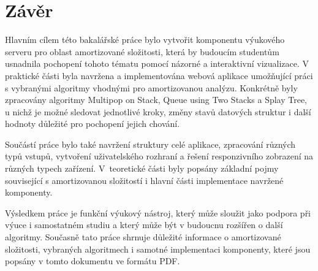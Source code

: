 \chapter{Závěr}
Hlavním cílem této bakalářské práce bylo vytvořit komponentu výukového serveru pro oblast amortizované složitosti, která by budoucím studentům usnadnila pochopení tohoto tématu pomocí názorné a interaktivní vizualizace. V praktické části byla navržena a implementována webová aplikace umožňující práci s vybranými algoritmy vhodnými pro amortizovanou analýzu. Konkrétně byly zpracovány algoritmy Multipop on Stack, Queue using Two Stacks a Splay Tree, u nichž je možné sledovat jednotlivé kroky, změny stavů datových struktur i další hodnoty důležité pro pochopení jejich chování.

Součástí práce bylo také navržení struktury celé aplikace, zpracování různých typů vstupů, vytvoření uživatelského rozhraní a řešení responzivního zobrazení na různých typech zařízení. V~teoretické části byly popsány základní pojmy související s amortizovanou složitostí i hlavní části implementace navržené komponenty.

Výsledkem práce je funkční výukový nástroj, který může sloužit jako podpora při výuce i samostatném studiu a který může být v budoucnu rozšířen o další algoritmy. Současně tato práce shrnuje důležité informace o amortizované složitosti, vybraných algoritmech i samotné implementaci komponenty, které jsou popsány v tomto dokumentu ve formátu PDF.